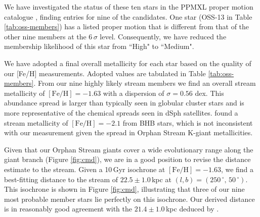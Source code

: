 \documentclass[10pt,apjl]{emulateapj}
\begin{document}
We have investigated the status of these ten stars in the PPMXL proper motion catalogue \citep{Roeser_et-al_2010}, finding entries for nine of the candidates. One star (OSS-13 in Table \ref{tab:oss-members}) has a listed proper motion that is different from that of the other nine members at the $6\,\sigma$ level. Consequently, we have reduced the membership likelihood of this star from ``High" to ``Medium".

We have adopted a final overall metallicity for each star based on the quality of our [Fe/H] measurements. Adopted values are tabulated in Table \ref{tab:oss-members}. From our nine highly likely stream members we find an overall stream metallicity of $[\mbox{Fe/H}] = -1.63$ with a dispersion of $\sigma = 0.56$ dex. This abundance spread is larger than typically seen in globular cluster stars and is more representative of the chemical spreads seen in dSph satellites. \citet{Newberg_et-al_2010} found a stream metallicity of $[\mbox{Fe/H}] = -2.1$ from BHB stars, which is not inconsistent with our measurement given the spread in Orphan Stream K-giant metallicities.

Given that our Orphan Stream giants cover a wide evolutionary range along the giant branch (Figure \ref{fig:cmd}), we are in a good position to revise the distance estimate to the stream. Given a 10\,Gyr \citet{Girardi_et-al_2008} isochrone at $[\mbox{Fe/H}] = -1.63$, we find a best-fitting distance to the stream of $22.5 \pm 1.0$\,kpc at $(l, b) = (250\,^\circ,\,50\,^\circ)$. This isochrone is shown in Figure \ref{fig:cmd}, illustrating that three of our nine most probable member stars lie perfectly on this isochrone. Our derived distance is in reasonably good agreement with the $21.4 \pm 1.0$\,kpc deduced by \citet{Newberg_et-al_2010}.
\end{document}

